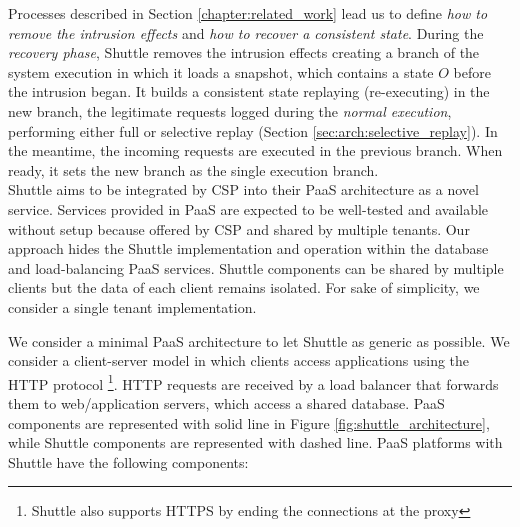 Processes described in Section \ref{chapter:related_work} lead us to define \textit{how to remove the intrusion effects} and \textit{how to recover a consistent state}. During the \emph{recovery phase}, Shuttle removes the intrusion effects creating a branch of the system execution in which it loads a snapshot, which contains a state $O$ before the intrusion began. It builds a consistent state replaying (re-executing) in the new branch, the legitimate requests logged during the \emph{normal execution}, performing either full or selective replay (Section \ref{sec:arch:selective_replay}). In the meantime, the incoming requests are executed in the previous branch. When ready, it sets the new branch as the single execution branch.\\



Shuttle aims to be integrated by \acf{CSP} into their \ac{PaaS} architecture as a novel service. Services provided in \ac{PaaS} are expected to be well-tested and available without setup because offered by \ac{CSP} and shared by multiple tenants. Our approach hides the Shuttle implementation and operation within the database and load-balancing \ac{PaaS} services. Shuttle components can be shared by multiple clients but the data of each client remains isolated. For sake of simplicity, we consider a single tenant implementation.

We consider a minimal \ac{PaaS} architecture to let Shuttle as generic as possible. We consider a client-server model in which clients access applications using the \ac{HTTP} protocol \footnote{Shuttle also supports HTTPS by ending the connections at the proxy}. \ac{HTTP} requests are received by a load balancer that forwards them to web/application servers, which access a shared database. {PaaS} components are represented with solid line in Figure \ref{fig:shuttle_architecture}, while Shuttle components are represented with dashed line. \ac{PaaS} platforms with Shuttle have the following components:

